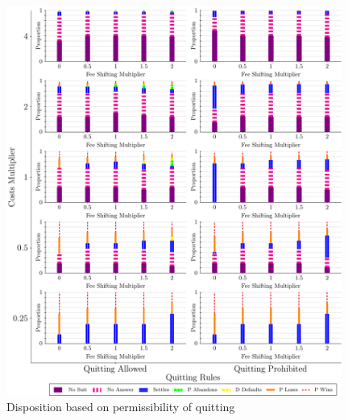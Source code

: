\documentclass{article}
\begin{document}
\begin{figure}
    \centering
    \begin{minipage}{0.48\textwidth}
        \centering
        \includegraphics[width=0.98\textwidth, scale=0.70, trim={0in 0in 0in 0in}, clip]{../Figures/Disposition Varying Quitting Rules} %
        \caption{Disposition based on permissibility of quitting}
		\label{fig:dispositions_quit}
    \end{minipage}\hfill
    \begin{minipage}{0.48\textwidth}
        \centering

\end{minipage}
\end{figure}
\end{document}
